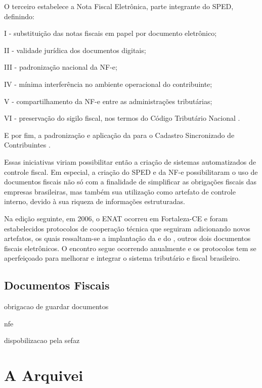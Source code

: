 O terceiro estabelece a Nota Fiscal Eletrônica, parte integrante do SPED, definindo:

\begin{citacao}
I - substituição das notas fiscais em papel por documento eletrônico;

II - validade jurídica dos documentos digitais;

III - padronização nacional da NF-e;

IV - mínima interferência no ambiente operacional do contribuinte;

V - compartilhamento da NF-e entre as administrações tributárias;

VI - preservação do sigilo fiscal, nos termos do Código Tributário Nacional \cite{enat:2005:protocolo3}. 
\end{citacao}

E por fim, a padronização e aplicação da  para o Cadastro Sincronizado de Contribuintes \cite{enat:2005:protocolo4}.

Essas iniciativas viriam possibilitar então a criação de sistemas automatizados de controle fiscal. Em especial, a criação do SPED e da NF-e possibilitaram o uso de documentos fiscais não só com a finalidade de simplificar as obrigações fiscais das empresas brasileiras, mas também sua utilização como artefato de controle interno, devido à sua riqueza de informações estruturadas.

Na edição seguinte, em 2006, o ENAT ocorreu em Fortaleza-CE e foram estabelecidos protocolos de cooperação técnica que seguiram adicionando novos artefatos, os quais ressaltam-se a implantação da  e do , outros dois documentos fiscais eletrônicos. O encontro segue ocorrendo anualmente e os protocolos tem se aperfeiçoado para melhorar e integrar o sistema tributário e fiscal brasileiro.


\subsection{Documentos Fiscais}



obrigacao de guardar documentos

nfe

dispobilizacao pela sefaz

\section{A Arquivei}
\label{section:arquivei}

